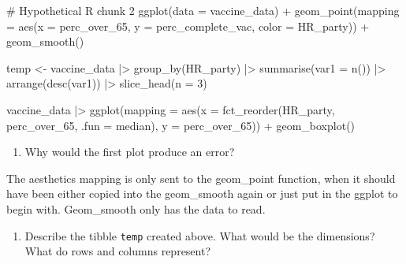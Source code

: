 \documentclass[
  letterpaper,
  DIV=11,
  numbers=noendperiod]{scrartcl}
\newenvironment{Shaded}{\begin{snugshade}}{\end{snugshade}}
\newcommand{\AttributeTok}[1]{\textcolor[rgb]{0.40,0.45,0.13}{#1}}
\newcommand{\CommentTok}[1]{\textcolor[rgb]{0.37,0.37,0.37}{#1}}
\newcommand{\DecValTok}[1]{\textcolor[rgb]{0.68,0.00,0.00}{#1}}
\newcommand{\FunctionTok}[1]{\textcolor[rgb]{0.28,0.35,0.67}{#1}}
\newcommand{\NormalTok}[1]{\textcolor[rgb]{0.00,0.23,0.31}{#1}}
\newcommand{\OtherTok}[1]{\textcolor[rgb]{0.00,0.23,0.31}{#1}}
\newcommand{\SpecialCharTok}[1]{\textcolor[rgb]{0.37,0.37,0.37}{#1}}
\providecommand{\tightlist}{%
  \setlength{\itemsep}{0pt}\setlength{\parskip}{0pt}}
\begin{document}
\begin{Shaded}
\begin{Highlighting}[]
\CommentTok{\# Hypothetical R chunk 2}
\FunctionTok{ggplot}\NormalTok{(}\AttributeTok{data =}\NormalTok{ vaccine\_data) }\SpecialCharTok{+}
  \FunctionTok{geom\_point}\NormalTok{(}\AttributeTok{mapping =} \FunctionTok{aes}\NormalTok{(}\AttributeTok{x =}\NormalTok{ perc\_over\_65, }\AttributeTok{y =}\NormalTok{ perc\_complete\_vac, }
                           \AttributeTok{color =}\NormalTok{ HR\_party)) }\SpecialCharTok{+}
  \FunctionTok{geom\_smooth}\NormalTok{()}

\NormalTok{temp }\OtherTok{\textless{}{-}}\NormalTok{ vaccine\_data }\SpecialCharTok{|\textgreater{}}
  \FunctionTok{group\_by}\NormalTok{(HR\_party) }\SpecialCharTok{|\textgreater{}}
  \FunctionTok{summarise}\NormalTok{(}\AttributeTok{var1 =} \FunctionTok{n}\NormalTok{()) }\SpecialCharTok{|\textgreater{}}
  \FunctionTok{arrange}\NormalTok{(}\FunctionTok{desc}\NormalTok{(var1)) }\SpecialCharTok{|\textgreater{}}
  \FunctionTok{slice\_head}\NormalTok{(}\AttributeTok{n =} \DecValTok{3}\NormalTok{)}

\NormalTok{vaccine\_data }\SpecialCharTok{|\textgreater{}}
  \FunctionTok{ggplot}\NormalTok{(}\AttributeTok{mapping =} \FunctionTok{aes}\NormalTok{(}\AttributeTok{x =} \FunctionTok{fct\_reorder}\NormalTok{(HR\_party, perc\_over\_65, }\AttributeTok{.fun =}\NormalTok{ median), }
                       \AttributeTok{y =}\NormalTok{ perc\_over\_65)) }\SpecialCharTok{+}
    \FunctionTok{geom\_boxplot}\NormalTok{()}
\end{Highlighting}
\end{Shaded}

\begin{enumerate}
\def\labelenumi{\alph{enumi})}
\tightlist
\item
  Why would the first plot produce an error?
\end{enumerate}

The aesthetics mapping is only sent to the geom\_point function, when it
should have been either copied into the geom\_smooth again or just put
in the ggplot to begin with. Geom\_smooth only has the data to read.

\begin{enumerate}
\def\labelenumi{\alph{enumi})}
\setcounter{enumi}{1}
\tightlist
\item
  Describe the tibble \texttt{temp} created above. What would be the
  dimensions? What do rows and columns represent?
\end{enumerate}
\end{document}

